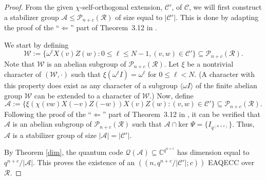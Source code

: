 \documentclass{article}
\DeclareMathOperator{\rank}{rank}
\theoremstyle{remark}
\theoremstyle{definition}
\numberwithin{equation}{section}
\begin{document}
\begin{proof} From the given $\chi$-self-orthogonal extension, $\mathcal{C'}$, of $\mathcal{C}$, we will first construct a stabilizer group $\mathcal{A} \le \mathcal{P}_{n+c}(\mathcal{R})$ of size equal to $|\mathcal{C}'|$. This is done by adapting the proof of the ``$\Leftarrow$'' part of Theorem~3.12 in \cite{luerssen}.

We start by defining
$$ \mathcal{W}:=\{ \omega^\ell X(v)Z(w) : 0 \leq \ell \leq N-1, (v,w) \in \mathcal{C}'\} \subseteq \mathcal{P}_{n+c}(\mathcal{R}).$$
Note that $\mathcal{W}$ is an abelian subgroup of $\mathcal{P}_{n+c}(\mathcal{R}).$ 
Let $\xi$ be a nontrivial character of $(\mathcal{W},\cdot)$ such that $\xi(\omega^\ell I)=\omega^\ell$ for $0 \leq \ell < N.$ (A character with this property does exist as any character of a subgroup $\langle \omega I \rangle$ of the finite abelian group $\mathcal{W}$  can be
extended to a character of $\mathcal{W}$.) 
Now, define
$$ \mathcal{A}:=\{ \xi(\chi(vw)X(-v)Z(-w))X(v)Z(w) : (v,w) \in \mathcal{C}'\} \subseteq \mathcal{P}_{n+c}(\mathcal{R}).$$
Following the proof of the ``$\Leftarrow$'' part of Theorem~3.12 in \cite{luerssen}, it can be verified that $\mathcal{A}$ is an abelian subgroup of $\mathcal{P}_{n+c}(\mathcal{R})$ such that $\mathcal{A} \cap \text{ker } \Psi= \{I_{q{^{(n+c)}}}\}$. Thus, $\mathcal{A}$ is a stabilizer group of size $|\mathcal{A}| = |\mathcal{C}'|$.



 
  By Theorem \ref{dim}, the quantum code $\mathcal{Q}(\mathcal{A}) \subseteq \mathbb{C}^{q^{n+c}}$ has dimension equal to $q^{n+c}/|\mathcal{A}|.$ This proves the existence of an $((n,q^{n+c}/|\mathcal{C}'|; c))$ EAQECC over $\mathcal{R}.$


\end{proof}
\end{document}
